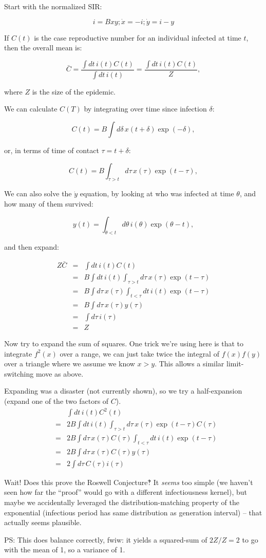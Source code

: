 \documentclass[12pt]{article}
\begin{document}
Start with the normalized SIR:

$$ i = Bxy; \dot x = -i; \dot y = i-y $$

If $C(t)$ is the case reproductive number for an individual infected at time $t$, then the overall mean is:

$$
	\bar C 
	= \frac{\int{dt\, i(t) C(t)}}{\int{dt\, i(t)}}
	= \frac{\int{dt\, i(t) C(t)}}{Z}, 
$$

where $Z$ is the size of the epidemic.

We can calculate $C(T)$ by integrating over time since infection $\delta$:

$$C(t) = B \int{d\delta\, x(t+\delta) \exp(-\delta)}, $$

or, in terms of time of contact $\tau=t+\delta$:

$$C(t) = B \int_{\tau>t}{d\tau\, x(\tau) \exp(t-\tau)}, $$

We can also solve the $\dot y$ equation, by looking at who was infected at time $\theta$, and how many of them survived:

$$ y(t) = \int_{\theta<t}{d\theta\, i(\theta)\exp(\theta-t)},$$

and then expand:

\begin{eqnarray}
	Z \bar C
	&=& \int{dt\, i(t) C(t)}
	\\ &=& B \int{dt\, i(t) \int_{\tau>t}{d\tau\, x(\tau) \exp(t-\tau)}}
	\\ &=& B \int{d\tau\, x(\tau) \int_{t<\tau}dt\, i(t) \exp(t-\tau)}
	\\ &=& B \int{d\tau\, x(\tau) y(\tau)}
	\\ &=& \int{d\tau\, i(\tau)}
	\\ &=& Z
\end{eqnarray}

Now try to expand the sum of squares. One trick we're using here is that to integrate $f^2(x)$ over a range, we can just take twice the integral of $f(x)f(y)$ over a triangle where we assume we know $x>y$. This allows a similar limit-switching move as above.

Expanding was a disaster (not currently shown), so we try a half-expansion (expand one of the two factors of $C$).
\begin{eqnarray}
	&& \int{dt\, i(t) C^2(t)}
	\\ &=& 2B \int{dt\, i(t) \int_{\tau>t}{d\tau\, x(\tau) \exp(t-\tau) C(\tau)}}
	\\ &=& 2B \int{d\tau\, x(\tau) C(\tau) \int_{t<\tau}{dt\, i(t) \exp(t-\tau)}}
	\\ &=& 2B \int{d\tau\, x(\tau) C(\tau) y(\tau)}
	\\ &=& 2 \int{d\tau\, C(\tau) i(\tau)}
\end{eqnarray}

Wait! Does this prove the Roswell Conjecture‽ It \emph{seems} too simple (we haven't seen how far the “proof” would go with a different infectiousness kernel), but maybe we accidentally leveraged the distribution-matching property of the exponential (infectious period has same distribution as generation interval) – that actually seems plausible.

PS: This does balance correctly, fwiw: it yields a squared-sum of $2Z/Z = 2$ to go with the mean of 1, so a variance of 1.
\end{document}
